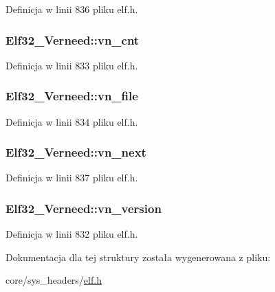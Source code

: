 Definicja w linii 836 pliku elf.\-h.

\hypertarget{struct_elf32___verneed_a8c8c56b63ee1f38cf5568fa7bd5b4f73}{
\subsubsection[{vn\-\_\-cnt}]{ Elf32\-\_\-\-Verneed\-::vn\-\_\-cnt}}\label{struct_elf32___verneed_a8c8c56b63ee1f38cf5568fa7bd5b4f73}


Definicja w linii 833 pliku elf.\-h.

\hypertarget{struct_elf32___verneed_a71c12598274c795cca809b99462e062a}{
\subsubsection[{vn\-\_\-file}]{ Elf32\-\_\-\-Verneed\-::vn\-\_\-file}}\label{struct_elf32___verneed_a71c12598274c795cca809b99462e062a}


Definicja w linii 834 pliku elf.\-h.

\hypertarget{struct_elf32___verneed_ae3819b6239b81ed5c8ce4f8710176870}{
\subsubsection[{vn\-\_\-next}]{ Elf32\-\_\-\-Verneed\-::vn\-\_\-next}}\label{struct_elf32___verneed_ae3819b6239b81ed5c8ce4f8710176870}


Definicja w linii 837 pliku elf.\-h.

\hypertarget{struct_elf32___verneed_ae87cf6c64587fcf3cd80ba2f6aa6b1bb}{
\subsubsection[{vn\-\_\-version}]{ Elf32\-\_\-\-Verneed\-::vn\-\_\-version}}\label{struct_elf32___verneed_ae87cf6c64587fcf3cd80ba2f6aa6b1bb}


Definicja w linii 832 pliku elf.\-h.



Dokumentacja dla tej struktury została wygenerowana z pliku\-:\begin{DoxyCompactItemize}
\item 
core/sys\-\_\-headers/\hyperlink{elf_8h}{elf.\-h}\end{DoxyCompactItemize}
